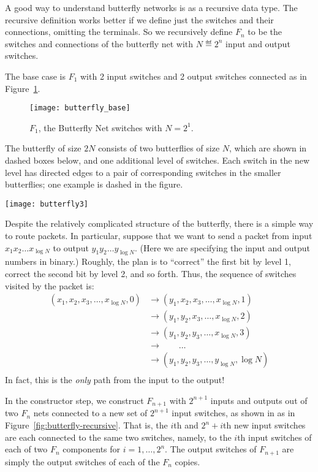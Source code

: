 A good way to understand butterfly networks is as a recursive data
type.  The recursive definition works better if we define just the
switches and their connections, omitting the terminals.  So we
recursively define $F_n$ to be the switches and connections of the
butterfly net with $N \eqdef 2^n$ input and output switches.

The base case is $F_1$ with 2 input switches and 2 output switches
connected as in Figure~\ref{fig:butterfly-base}.

\begin{figure}
\texttt{[image: butterfly\_base]}
\caption{$F_1$, the Butterfly Net switches with $N=2^1$.}
\label{fig:butterfly-base}
\end{figure}

\begin{editingnotes}

The butterfly of size $2N$ consists of two butterflies of size $N$, which
are shown in dashed boxes below, and one additional level of switches.
Each switch in the new level has directed edges to a pair of
corresponding switches in the smaller butterflies; one example is
dashed in the figure.

\texttt{[image: butterfly3]}

Despite the relatively complicated structure of the butterfly, there
is a simple way to route packets.  In particular, suppose that we want
to send a packet from input $x_1 x_2 \dots x_{\log N}$ to output $y_1
y_2 \dots y_{\log N}$.  (Here we are specifying the input and output
numbers in binary.)  Roughly, the plan is to ``correct'' the first bit
by level 1, correct the second bit by level 2, and so forth.  Thus,
the sequence of switches visited by the packet is:
%
\begin{align*}
(x_1, x_2, x_3, \dots, x_{\log N}, 0)
    & \to (y_1, x_2, x_3, \dots, x_{\log N}, 1) \\
    & \to (y_1, y_2, x_3, \dots, x_{\log N}, 2) \\
    & \to (y_1, y_2, y_3, \dots, x_{\log N}, 3) \\
    & \to \qquad \dots \\
    & \to (y_1, y_2, y_3, \dots, y_{\log N}, \log N) \\
\end{align*}
%
In fact, this is the \textit{only} path from the input to the output!
\end{editingnotes}


In the constructor step, we construct $F_{n+1}$ with $2^{n+1}$ inputs and
outputs out of two $F_n$ nets connected to a new set of $2^{n+1}$ input
switches, as shown in as in Figure~\ref{fig:butterfly-recursive}.  That
is, the $i$th and $2^n+i$th new input switches are each connected to the
same two switches, namely, to the $i$th input switches of each of two
$F_n$ components for $i=1,\dots,2^n$.  The output switches of $F_{n+1}$
are simply the output switches of each of the $F_n$ copies.

